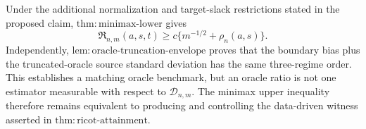 Under the additional normalization and target-slack restrictions stated in the proposed claim, \(\mathrm{thm:minimax\text{-}lower}\) gives
\[
\mathfrak R_{n,m}(a,s,t)\ge c\{m^{-1/2}+\rho_n(a,s)\}.
\]
Independently, \(\mathrm{lem:oracle\text{-}truncation\text{-}envelope}\) proves that the boundary bias plus the truncated-oracle source standard deviation has the same three-regime order. This establishes a matching oracle benchmark, but an oracle ratio is not one estimator measurable with respect to \(\mathcal D_{n,m}\). The minimax upper inequality therefore remains equivalent to producing and controlling the data-driven witness asserted in \(\mathrm{thm:ricot\text{-}attainment}\).